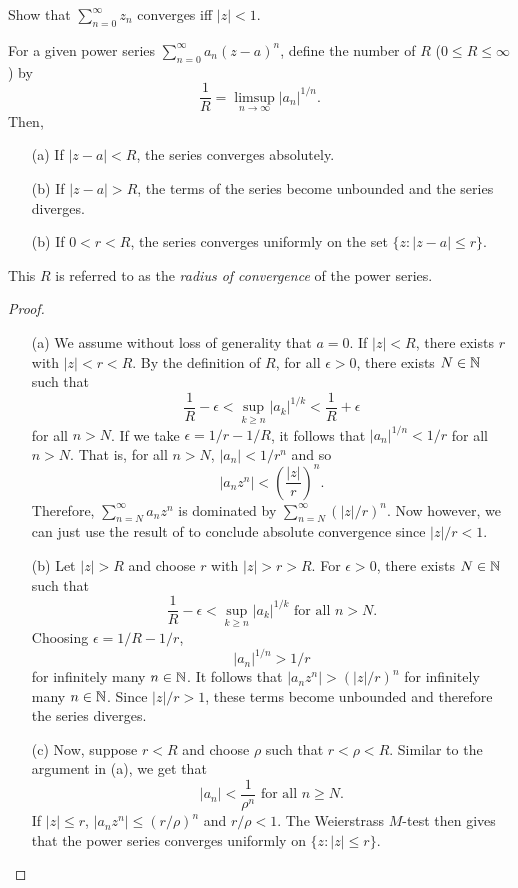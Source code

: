 	\begin{exercise}
		\label{ex: conv of summ zn}
		Show that $\sum_{n=0}^\infty z_n$ converges iff $|z| < 1$.
	\end{exercise}

	\begin{ftheo}
		For a given power series $\sum_{n=0}^\infty a_n (z-a)^n$, define the number of $R$ ($0\le R\le \infty$) by
		\[ \frac{1}{R} = \limsup_{n\to\infty} |a_n|^{1/n}. \]
		Then,
		\begin{itemize}
			\item[(a)] If $|z-a| < R$, the series converges absolutely.
			\item[(b)] If $|z-a| > R$, the terms of the series become unbounded and the series diverges.
			\item[(b)] If $0 < r < R$, the series converges uniformly on the set $\{ z : |z-a| \le r \}$.
		\end{itemize}
	\end{ftheo}

	This $R$ is referred to as the \emph{radius of convergence} of the power series.

	\begin{proof}
		\phantom{easter}
		\begin{itemize}
			\item[(a)]
			We assume without loss of generality that $a = 0$. If $|z| < R$, there exists $r$ with $|z| < r < R$. By the definition of $R$, for all $\epsilon>0$, there exists $N \in \mathbb{N}$ such that
			\[ \frac{1}{R} - \epsilon < \sup_{k \ge n} |a_k|^{1/k} < \frac{1}{R} + \epsilon \]
			for all $n > N$. If we take $\epsilon = 1/r - 1/R$, it follows that $|a_n|^{1/n} < 1/r$ for all $n > N$. That is, for all $n > N$, $|a_n| < 1/r^n$ and so 
			\[ |a_n z^n| < \left(\frac{|z|}{r}\right)^n. \]
			Therefore, $\sum_{n=N}^\infty a_n z^n$ is dominated by $\sum_{n=N}^\infty (|z|/r)^n$. Now however, we can just use the result of  to conclude absolute convergence since $|z|/r < 1$.
			
			\item[(b)]
			Let $|z| > R$ and choose $r$ with $|z| > r > R$. For $\epsilon > 0$, there exists $N \in \mathbb{N}$ such that
			\[ \frac{1}{R} - \epsilon < \sup_{k \ge n} |a_k|^{1/k} \text{ for all $n > N$}. \]
			Choosing $\epsilon = 1/R - 1/r$,
			\[ |a_n|^{1/n} > 1/r \]
			for infinitely many $n \in \mathbb{N}$. It follows that $|a_n z^n| > (|z|/r)^n$ for infinitely many $n \in \mathbb{N}$. Since $|z|/r > 1$, these terms become unbounded and therefore the series diverges.

			\item[(c)]
			Now, suppose $r<R$ and choose $\rho$ such that $r<\rho<R$. Similar to the argument in (a), we get that
			\[ |a_n| < \frac{1}{\rho^n} \text{ for all $n\ge N$.} \]
			If $|z| \le r$, $|a_n z^n| \le (r/\rho)^n$ and $r/\rho < 1$. The Weierstrass $M$-test then gives that the power series converges uniformly on $\{z : |z| \le r\}$. \qedhere
		\end{itemize}
	\end{proof}

